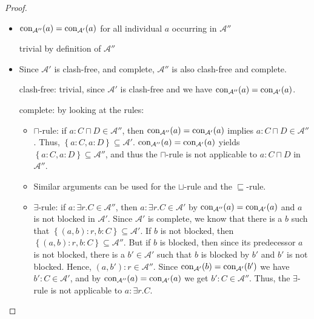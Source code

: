 \begin{proof}
\begin{itemize}
		\item $\operatorname{\text{con}}_{\mathcal{A}''}(a) =  \operatorname{\text{con}}_{\mathcal{A}'}(a)$ for all individual $a$ occurring in $\mathcal{A}''$ 
			\begin{subproof}
				trivial by definition of  $\mathcal{A}''$
			\end{subproof}

		\item Since $\mathcal{A}'$ is clash-free, and complete, $\mathcal{A}''$ is also clash-free and complete.
			\begin{subproof}
				clash-free: trivial, since  $\mathcal{A}'$ is clash-free
				and we have $\operatorname{\text{con}}_{\mathcal{A}''}(a) =  \operatorname{\text{con}}_{\mathcal{A}'}(a)$.

				complete: by looking at the rules:
				\begin{itemize}
					\item $\sqcap$-rule: if $a : C \sqcap D \in \mathcal{A}''$,
						then $\operatorname{\text{con}}_{\mathcal{A}''}(a) =  \operatorname{\text{con}}_{\mathcal{A}'}(a)$ implies
						$a : C \sqcap D \in \mathcal{A}''$.
						Thus, $\left\{ a:C, a:D \right\}\subseteq \mathcal{A}'$.
						$\operatorname{\text{con}}_{\mathcal{A}''}(a) =  \operatorname{\text{con}}_{\mathcal{A}'}(a)$	yields $\left\{ a:C, a:D \right\}\subseteq \mathcal{A}''$,
						and thus the $\sqcap$-rule is not applicable to $a:C \sqcap D$ in $\mathcal{A}''$.
					\item Similar arguments can be used for the $\sqcup$-rule and the $\sqsubseteq$-rule.
					\item $\exists$-rule: if $a: \exists r.C \in \mathcal{A}''$,
						then $a : \exists r.C \in \mathcal{A}'$ by $\operatorname{\text{con}}_{\mathcal{A}''}(a) =  \operatorname{\text{con}}_{\mathcal{A}'}(a)$
						and $a$ is not blocked in $\mathcal{A}'$.
						Since $\mathcal{A}'$ is complete, we know that there is a $b$ such that
						$\left\{ (a,b):r, b:C \right\} \subseteq \mathcal{A}'$.
						If $b$ is not blocked, then $\left\{ (a,b):r, b:C \right\} \subseteq \mathcal{A}''$.
						But if $b$ is blocked, then since its predecessor $a$ is not blocked,
						there is a $b' \in \mathcal{A}'$ such that $b$ is blocked by $b'$
						and $b'$ is not blocked.
						Hence, $(a,b'):r \in \mathcal{A}''$.
						Since $\operatorname{\text{con}}_{\mathcal{A}'}(b) =  \operatorname{\text{con}}_{\mathcal{A}'}(b')$ we have
						$b':C \in \mathcal{A}'$, and by $\operatorname{\text{con}}_{\mathcal{A}''}(a) =  \operatorname{\text{con}}_{\mathcal{A}'}(a)$ we get
						$b':C \in \mathcal{A}''$.
						Thus, the $\exists$-rule is not applicable to $a: \exists r.C$.
				\end{itemize}
			\end{subproof}
	\end{itemize}
\end{proof}
